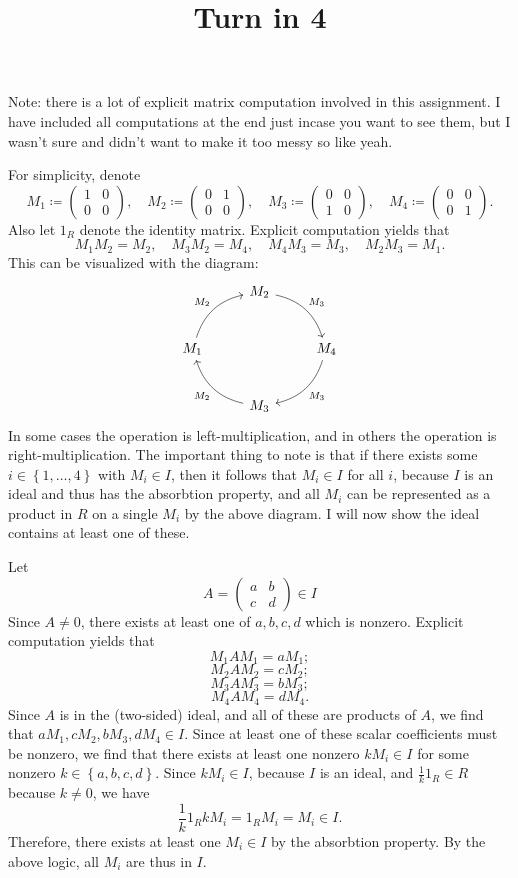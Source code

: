 \documentclass[11pt, letterpaper]{article}
\title{Turn in 4}
\begin{document}
\makeproblem
Note: there is a lot of explicit matrix computation involved in this assignment. I have included all computations at the end just incase you want to see them, but I wasn't sure and didn't want to make it too messy so like yeah.

For simplicity, denote
\[
	M_1\coloneqq \begin{pmatrix}
	1 & 0 \\
	0 & 0
	\end{pmatrix},\quad M_2\coloneqq \begin{pmatrix}
	0 & 1 \\
	0 & 0
	\end{pmatrix},\quad M_3\coloneqq \begin{pmatrix}
	0 & 0 \\
	1 & 0
	\end{pmatrix},\quad M_4\coloneqq \begin{pmatrix}
	0 & 0 \\
	0 & 1
	\end{pmatrix}
.\]
Also let $1_R$ denote the identity matrix. Explicit computation yields that
\[
	M_1M_2=M_2,\quad M_3M_2=M_4,\quad M_4M_3=M_3,\quad M_2M_3=M_1
.\]
This can be visualized with the diagram:
\[\begin{tikzcd}[row sep = 2.5em, column sep = 2.5em]
	&M_2\arrow[dr, bend left, "M_3"]\\
	M_1\arrow[ur, bend left, "M_2"]&&M_4\arrow[dl, bend left, "M_3"]\\
				       &M_3\arrow[ul, bend left, "M_2"]
\end{tikzcd}\]
In some cases the operation is left-multiplication, and in others the operation is right-multiplication. The important thing to note is that if there exists some $i\in \left\{ 1, \ldots , 4 \right\} $ with $M_i\in I$, then it follows that $M_i\in I$ for all $i$, because $I$ is an ideal and thus has the absorbtion property, and all $M_i$ can be represented as a product in $R$ on a single $M_i$ by the above diagram. I will now show the ideal contains at least one of these.

Let
\[
	A=\begin{pmatrix}
	a & b \\
	c & d
	\end{pmatrix}\in I
\]
Since $A\neq 0$, there exists at least one of $a,b,c,d$ which is nonzero. Explicit computation yields that
\[
	M_1AM_1=aM_1;
\]
\[
	M_2AM_2=cM_2;
\]
\[
	M_3AM_3=bM_3;
\]
\[
	M_4AM_4=dM_4
.\]
Since $A$ is in the (two-sided) ideal, and all of these are products of $A$, we find that $aM_1,cM_2,bM_3,dM_4\in I$. Since at least one of these scalar coefficients must be nonzero, we find that there exists at least one nonzero $kM_i\in I$ for some nonzero $k\in \left\{ a,b,c,d \right\} $. Since $kM_i\in I$, because $I$ is an ideal, and $\frac{1}{k} 1_R\in R$ because $k\neq 0$, we have
\[
	\frac{1}{k} 1_R kM_i=1_RM_i=M_i\in I
.\]
Therefore, there exists at least one $M_i\in I$ by the absorbtion property. By the above logic, all $M_i$ are thus in $I$.
\end{document}

